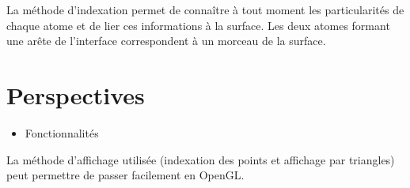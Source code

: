 La méthode d'indexation permet de connaître à tout moment les particularités de chaque
atome et de lier ces informations à la surface. Les deux atomes formant une arête
de l'interface correspondent à un morceau de la surface.



\section{Perspectives}
\begin{itemize}
  \item Fonctionnalités
\end{itemize}

La méthode d'affichage utilisée (indexation des points et affichage par triangles)
peut permettre de passer facilement en OpenGL.
